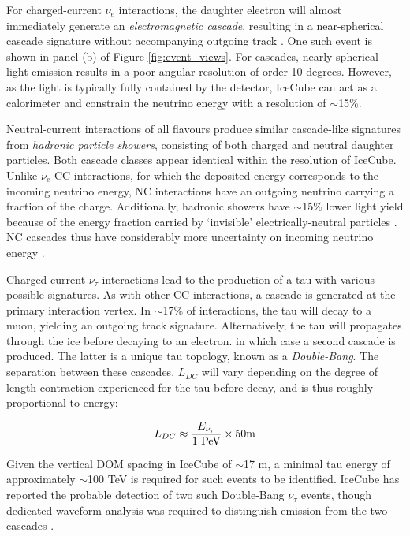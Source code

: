 For charged-current $\nu_{e}$ interactions, the daughter electron will almost immediately generate an \emph{electromagnetic cascade}, resulting in a near-spherical cascade signature without accompanying outgoing track . One such event is shown in panel (b) of Figure \ref{fig:event_views}. For cascades, nearly-spherical light emission results in a poor angular resolution of order 10 degrees. However, as the light is typically fully contained by the detector, IceCube can act as a calorimeter and constrain the neutrino energy with a resolution of $\sim$15\%. 

Neutral-current interactions of all flavours produce similar cascade-like signatures from \emph{hadronic particle showers}, consisting of both charged and neutral daughter particles. Both cascade classes appear identical within the resolution of IceCube. Unlike $\nu_{e}$ CC interactions, for which the deposited energy corresponds to the incoming neutrino energy, NC interactions have an outgoing neutrino carrying a fraction of the charge. Additionally, hadronic showers have $\sim$15\% lower light yield because of the energy fraction carried by `invisible' electrically-neutral particles \cite{ic_energy_reco_14}. NC cascades thus have considerably more uncertainty on incoming neutrino energy \cite{ic_energy_reco_14}.

Charged-current $\nu_{\tau}$ interactions lead to the production of a tau with various possible signatures. As with other CC interactions, a cascade is generated at the primary interaction vertex. In $\sim$17\% of interactions, the tau will decay to a muon, yielding an outgoing track signature. Alternatively, the tau will propagates through the ice before decaying to an electron. in which case a second cascade is produced. The latter is a unique tau topology, known as a \emph{Double-Bang}. The separation between these cascades, $L_{DC}$ will vary depending on the degree of length contraction experienced for the tau before decay, and is thus roughly proportional to energy:

\begin{equation}
	L_{DC}  \approx \frac{E_{\nu_{\tau}}}{\textup{1 PeV}} \times 50 \textup{m}
\end{equation}

Given the vertical  DOM spacing in IceCube of $\sim $17 m, a minimal tau energy of approximately $\sim$100 TeV is required for such events to be identified. IceCube has reported the probable detection of two such Double-Bang $\nu_{\tau}$ events, though dedicated waveform analysis was required to distinguish emission from the two cascades . 

